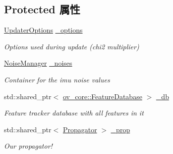 \subsection*{Protected 属性}
\begin{DoxyCompactItemize}
\item 
\mbox{\label{classov__msckf_1_1UpdaterZeroVelocity_a749638ff6ee8f1b0ba8eee2bef7e93e8}} 
\hyperlink{structov__msckf_1_1UpdaterOptions}{Updater\+Options} \hyperlink{classov__msckf_1_1UpdaterZeroVelocity_a749638ff6ee8f1b0ba8eee2bef7e93e8}{\+\_\+options}
\begin{DoxyCompactList}\small\item\em Options used during update (chi2 multiplier) \end{DoxyCompactList}\item 
\mbox{\label{classov__msckf_1_1UpdaterZeroVelocity_a40b315489e839b9f47168b13ff3ea625}} 
\hyperlink{structov__msckf_1_1NoiseManager}{Noise\+Manager} \hyperlink{classov__msckf_1_1UpdaterZeroVelocity_a40b315489e839b9f47168b13ff3ea625}{\+\_\+noises}
\begin{DoxyCompactList}\small\item\em Container for the imu noise values \end{DoxyCompactList}\item 
\mbox{\label{classov__msckf_1_1UpdaterZeroVelocity_a8faef43ba67821767973ee9a78c173cc}} 
std\+::shared\+\_\+ptr$<$ \hyperlink{classov__core_1_1FeatureDatabase}{ov\+\_\+core\+::\+Feature\+Database} $>$ \hyperlink{classov__msckf_1_1UpdaterZeroVelocity_a8faef43ba67821767973ee9a78c173cc}{\+\_\+db}
\begin{DoxyCompactList}\small\item\em Feature tracker database with all features in it \end{DoxyCompactList}\item 
\mbox{\label{classov__msckf_1_1UpdaterZeroVelocity_aff9a0009bd455014af4dea494fcb2b33}} 
std\+::shared\+\_\+ptr$<$ \hyperlink{classov__msckf_1_1Propagator}{Propagator} $>$ \hyperlink{classov__msckf_1_1UpdaterZeroVelocity_aff9a0009bd455014af4dea494fcb2b33}{\+\_\+prop}
\begin{DoxyCompactList}\small\item\em Our propagator! \end{DoxyCompactList}\item 

\end{DoxyCompactItemize}
